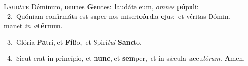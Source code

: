 \lettrine{\initial\textcolor{\initialcolor}{L}}{audáte} Dóminum, \textbf{om}\-nes \textbf{Gen}\-tes:~\star laudáte eum, \textit{om}\-\textit{nes} \textbf{pó}\-puli:\\
{\numbfont\textcolor{\numbcolor}{~2.}}~Quóniam confirmáta est super nos miseri\-\textbf{cór}\-dia \textbf{e}\-jus:~\star et véritas Dómini manet \textit{in} \textit{æ}\-\textbf{tér}num.\par
{\numbfont\textcolor{\numbcolor}{~3.}}~Glória \textbf{Pa}\-tri, et \textbf{Fí}\-\textbf{li}o,~\star et Spirí\-\textit{tu}\-\textit{i} \textbf{Sanc}\-to.\par
{\numbfont\textcolor{\numbcolor}{~4.}}~Sicut erat in princípio, et \textbf{nunc}\-, et \textbf{sem}\-per,~\star et in sǽcula sæcu\-\textit{ló}\-\textit{rum}. \textbf{A}\-men.\par
